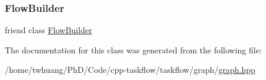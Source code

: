 \mbox{\label{classtf_1_1Task_a61184f9bd9c801d0a5eccecfdbddc641}} 
\subsubsection{\texorpdfstring{Flow\+Builder}{FlowBuilder}}
{\footnotesize\ttfamily friend class \hyperlink{classtf_1_1FlowBuilder}{Flow\+Builder}\hspace{0.3cm}{\ttfamily [friend]}}



The documentation for this class was generated from the following file\+:\begin{DoxyCompactItemize}
\item 
/home/twhuang/\+Ph\+D/\+Code/cpp-\/taskflow/taskflow/graph/\hyperlink{graph_8hpp}{graph.\+hpp}\end{DoxyCompactItemize}
